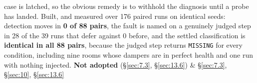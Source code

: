 \begin{longtable}[]
case is latched, so the obvious remedy is to withhold the diagnosis until a probe has landed. Built,
and measured over 176 paired runs on identical seeds: detection moves in \textbf{0 of 88 pairs}, the
fault is named on a genuinely judged step in 28 of the 39 runs that defer against 0 before, and
the settled classification is \textbf{identical in all 88 pairs}, because the judged step returns
\texttt{MISSING} for every condition, including nine rooms whose dampers are in perfect health and
one run with nothing injected. \textbf{Not adopted} (§\ref{sec:7.3}, §\ref{sec:13.6}) & §\ref{sec:7.3}, §\ref{sec:10}, §\ref{sec:13.6} \\
\bottomrule
\end{longtable}
